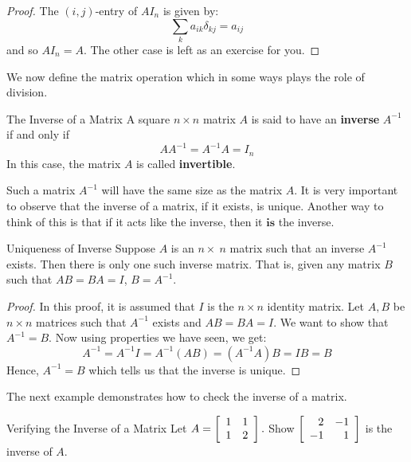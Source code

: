 \ifdefined\showproofs
\begin{proof}
The $(i,j)$-entry of $AI_n$ is given by:
\begin{equation*}
\sum_{k}a_{ik}\delta _{kj}=a_{ij}
\end{equation*}
and so $AI_{n}=A.$ The other case is left as an exercise for you. 
\end{proof}
\fi
We now define the matrix operation which in some ways plays the role of division. 

\begin{definition}{The Inverse of a Matrix}\label{def:invertiblematrix}
A square  $n\times n$ matrix $A$ is said to have an \textbf{inverse} $A^{-1}$
if and only if 
\begin{equation*}
AA^{-1}=A^{-1}A=I_n
\end{equation*}
In this case, the matrix $A$ is called
 \textbf{invertible}.
\end{definition}

Such a  matrix $A^{-1}$ will have the same size as the matrix $A$. 
It is very important to observe that the inverse of a matrix, if it exists,
is unique. Another way to think of this is that if it acts like the inverse,
then it $\textbf{is}$ the inverse.

\begin{theorem}{Uniqueness of Inverse}\label{thm:uniqueinverse}
Suppose $A$ is an $n \times\ n$ matrix such that an inverse  $A^{-1}$ exists. Then there is only one such 
inverse matrix. 
That is, given any matrix $B$ such that $AB=BA=I$, $B=A^{-1}$.
\end{theorem}

\ifdefined\showproofs
\begin{proof} In this proof, it is assumed that $I$ is the $n \times n$ identity matrix. 
Let $A, B$ be $n \times n$ matrices such that $A^{-1}$ exists and $AB=BA=I$. 
We want to show that $A^{-1} = B$. 
Now using properties we have seen, we get: 
\begin{equation*}
A^{-1}=A^{-1}I=A^{-1}\left( AB\right) =\left( A^{-1}A\right) B=IB=B
\end{equation*}
Hence, $A^{-1} = B$ which tells us that the inverse is unique.
\end{proof}
\fi
The next example demonstrates how to check the inverse of a matrix. 

\begin{example}{Verifying the Inverse of a Matrix}\label{exa:verifyinginverse}
Let $A=\left[
\begin{array}{rr}
1 & 1 \\
1 & 2
\end{array}
\right] .$ Show $\left[
\begin{array}{rr}
2 & -1 \\
-1 & 1
\end{array}
\right] $ is the inverse of $A.$
\end{example}

